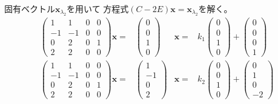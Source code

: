 \documentclass[12pt,b5paper]{ltjsarticle}
\begin{document}
固有ベクトル$\bm{x}_{\lambda_2}$を用いて
方程式$(C-2E)\bm{x}=\bm{x}_{\lambda_2}$を解く。
\begin{align}
 \begin{pmatrix}
  1 & 1 & 0 & 0\\
  -1 & -1 & 0 & 0\\
  0 & 2 & 0 & 1\\
  2 & 2 & 0 & 0
 \end{pmatrix}
 \bm{x}
 =&
 \begin{pmatrix} 0 \\ 0 \\ 1 \\ 0 \end{pmatrix}
 &
 \bm{x}=&
 k_1\begin{pmatrix} 0 \\ 0 \\ 1 \\ 0 \end{pmatrix}
 +\begin{pmatrix} 0 \\ 0 \\ 0 \\ 1 \end{pmatrix}\\
 \begin{pmatrix}
  1 & 1 & 0 & 0\\
  -1 & -1 & 0 & 0\\
  0 & 2 & 0 & 1\\
  2 & 2 & 0 & 0
 \end{pmatrix}
 \bm{x}
 =&
 \begin{pmatrix} 1 \\ -1 \\ 0 \\ 2 \end{pmatrix}
 &
 \bm{x}=&
 k_2\begin{pmatrix} 0 \\ 0 \\ 1 \\ 0 \end{pmatrix}
 +\begin{pmatrix} 0 \\ 1 \\ 0 \\ -2 \end{pmatrix}
\end{align}
\end{document}
